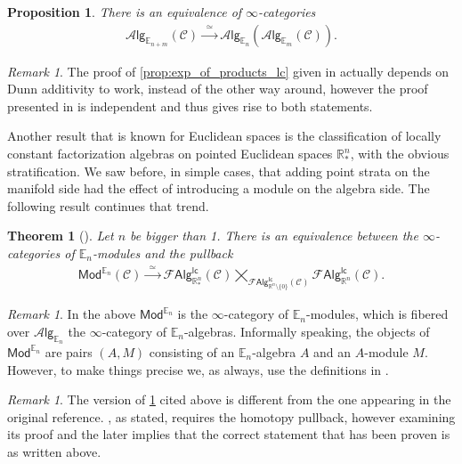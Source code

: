 \documentclass[12pt,a4paper]{article}
\newcounter{counter} \numberwithin{counter}{section}
\theoremstyle{definition}
\theoremstyle{plain}
\newtheorem{theorem}[counter]{Theorem}
\newtheorem{proposition}[counter]{Proposition}
\theoremstyle{remark}
\newtheorem{remark}[counter]{Remark}
\newcommand{\catC}{\mathscr{C}}
\newcommand{\lcfa}{\mathscr{F} \mathsf{Alg}^{\mathsf{lc}}}
\newcommand{\alg}[1]{\mathscr{A} \mathsf{lg}_{#1}}
\begin{document}
\begin{proposition}
    There is an equivalence of $\infty$-categories
    \begin{align}
        \alg{\mathbb{E}_{n + m}} (\catC) \xrightarrow{\ \ \simeq \ \ } \alg{\mathbb{E}_n} (\alg{\mathbb{E}_m} (\catC)). 
    \end{align}
\end{proposition}

\begin{remark}
    The proof of \cref{prop:exp_of_products_lc} given in \cite{ginot2015} actually depends on Dunn additivity to work, instead of the other way around, however the proof presented in \cite{lurie_ha} is independent and thus gives rise to both statements. 
\end{remark}

Another result that is known for Euclidean spaces is the classification of locally constant factorization algebras on pointed Euclidean spaces $\mathbb{R}^n_*$, with the obvious stratification. We saw before, in simple cases, that adding point strata on the manifold side had the effect of introducing a module on the algebra side. The following result continues that trend.

\begin{theorem}[{\cite[cor.8]{ginot2015}}]\label{thm:ginot_classif_Rn*}
    Let $n$ be bigger than 1. There is an equivalence between the $\infty$-categories of $\mathbb{E}_n$-modules and the pullback
    \begin{align}
        \mathsf{Mod}^{\mathbb{E}_n} (\catC) \xrightarrow{\ \ \simeq \ \ } \lcfa_{\mathbb{R}^n_*} (\catC) \bigtimes_{\lcfa_{\mathbb{R}^n \setminus \{ 0\} } (\catC)} \lcfa_{\mathbb{R}^n} (\catC).
    \end{align}
\end{theorem}

\begin{remark}
    In the above $\mathsf{Mod}^{\mathbb{E}_n}$ is the $\infty$-category of $\mathbb{E}_n$-modules, which is fibered over $\alg{\mathbb{E}_n}$ the $\infty$-category of $\mathbb{E}_n$-algebras. Informally speaking, the objects of $\mathsf{Mod}^{\mathbb{E}_n}$ are pairs $(A, M)$ consisting of an $\mathbb{E}_n$-algebra $A$ and an $A$-module $M$. However, to make things precise we, as always, use the definitions in \cite[ch.3]{lurie_ha}.
\end{remark}

\begin{remark}
    The version of \cref{thm:ginot_classif_Rn*} cited above is different from the one appearing in the original reference. \cite[cor.8]{ginot2015}, as stated, requires the homotopy pullback, however examining its proof and the later \cite[cor.9]{ginot2015} implies that the correct statement that has been proven is as written above.
\end{remark}
\end{document}
